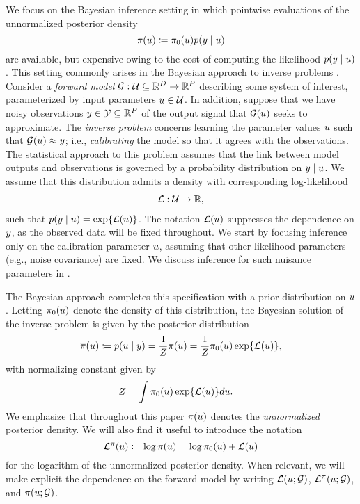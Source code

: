 \documentclass[12pt]{article}
\begin{document}
We focus on the Bayesian inference setting in which pointwise evaluations of the unnormalized posterior
density 
\begin{equation}
\pi(u) \coloneqq \pi_0(u) p(y \mid u) \label{post_dens_generic}
\end{equation}
are available, but expensive owing to the cost of computing the likelihood $p(y \mid u)$. This setting 
commonly arises in the Bayesian approach to inverse problems \citep{Stuart_BIP}. 
Consider a \textit{forward model} $\mathcal{G}: \mathcal{U} \subseteq \mathbb{R}^{D} \to \mathbb{R}^{P}$ describing 
some system of interest, parameterized by input parameters $u \in \mathcal{U}$. In addition, suppose that 
we have noisy observations $y \in \mathcal{Y} \subseteq \mathbb{R}^{P}$ of the output signal that $\mathcal{G}(u)$ 
seeks to approximate. The \textit{inverse problem} concerns learning the parameter values $u$ such
 that $\mathcal{G}(u) \approx y$; i.e., \textit{calibrating} the model so that it agrees with the observations. 
 The statistical approach to this problem assumes that the link between model outputs and 
observations is governed by a probability distribution on $y \mid u$. We assume that this distribution 
admits a density with corresponding log-likelihood 
\begin{align}
\mathcal{L}: \mathcal{U} \to \mathbb{R}, \label{log_likelihood}
\end{align}
such that $p(y \mid u) = \exp\mathopen{}\left\{\mathcal{L}(u)\right\}\mathclose{}$. The notation $\mathcal{L}(u)$ suppresses the dependence 
on $y$, as the observed data will be fixed throughout. We start by focusing inference only on the 
calibration parameter $u$, assuming that other likelihood parameters (e.g., noise covariance) 
are fixed. We discuss inference for such nuisance parameters in .

The Bayesian approach completes this specification with a prior distribution 
on $u$. Letting $\pi_0(u)$ denote the density of this distribution, the Bayesian solution of the inverse problem is given 
by the posterior distribution
\begin{align}
\overline{\pi}(u) \coloneqq p(u \mid y) = \frac{1}{Z}\pi(u) = \frac{1}{Z} \pi_0(u) \exp\mathopen{}\left\{\mathcal{L}(u)\right\}\mathclose{}, \label{post_dens}
\end{align}
with normalizing constant given by 
\begin{align}
Z &= \int \pi_0(u) \exp\mathopen{}\left\{\mathcal{L}(u)\right\}\mathclose{} du. \label{norm_cst}
\end{align}
We emphasize that throughout this paper $\pi(u)$ denotes the \textit{unnormalized} 
posterior density. We will also find it useful to introduce the notation
\begin{equation}
\mathcal{L}^{\pi}(u) \coloneqq \log \pi(u) = \log \pi_0(u) + \mathcal{L}(u) \label{eq:lpost}
\end{equation}
for the logarithm of the unnormalized posterior density.
When relevant, we will make explicit the dependence on the forward 
model by writing $\mathcal{L}(u; \mathcal{G})$, $\mathcal{L}^{\pi}(u; \mathcal{G})$, and $\pi(u; \mathcal{G})$. 
\end{document}
